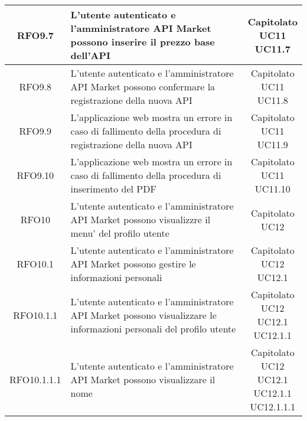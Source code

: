 \begin{longtable}{|c|p{8cm}|c|}
RFO9.7 &  L'utente autenticato e l'amministratore API Market possono inserire il prezzo base dell'API & \makecell*{Capitolato\\UC11\\UC11.7} \\
\hline

RFO9.8 & L'utente autenticato e l'amministratore API Market possono confermare la registrazione della nuova API & \makecell*{Capitolato\\UC11\\UC11.8} \\
\hline

RFO9.9 &  L'applicazione web mostra un errore in caso di fallimento della procedura di registrazione della nuova API & \makecell*{Capitolato\\UC11\\UC11.9} \\
\hline

RFO9.10 &  L'applicazione web mostra un errore in caso di fallimento della procedura di inserimento del PDF & \makecell*{Capitolato\\UC11\\UC11.10} \\
\hline

RFO10 &  L'utente autenticato e l'amministratore API Market possono visualizzre il menu' del profilo utente & \makecell*{Capitolato\\UC12} \\
\hline

RFO10.1 &  L'utente autenticato e l'amministratore API Market possono gestire le informazioni personali & \makecell*{Capitolato\\UC12\\UC12.1} \\
\hline

RFO10.1.1 &  L'utente autenticato e l'amministratore API Market possono visualizzare le informazioni personali del profilo utente &\makecell*{Capitolato\\UC12\\UC12.1\\UC12.1.1} \\
\hline

RFO10.1.1.1 &  L'utente autenticato e l'amministratore API Market possono visualizzare il nome & \makecell*{Capitolato\\UC12\\UC12.1\\UC12.1.1\\UC12.1.1.1} \\
\hline


\end{longtable}
